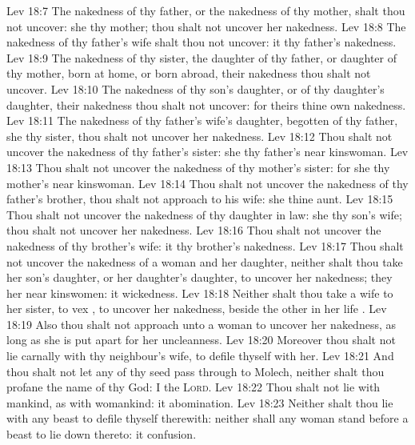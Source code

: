 \vs Lev 18:7 The nakedness of thy father, or the nakedness of thy mother, shalt thou not uncover: she  thy mother; thou shalt not uncover her nakedness.
\vs Lev 18:8 The nakedness of thy father's wife shalt thou not uncover: it  thy father's nakedness.
\vs Lev 18:9 The nakedness of thy sister, the daughter of thy father, or daughter of thy mother,  born at home, or born abroad,  their nakedness thou shalt not uncover.
\vs Lev 18:10 The nakedness of thy son's daughter, or of thy daughter's daughter,  their nakedness thou shalt not uncover: for theirs  thine own nakedness.
\vs Lev 18:11 The nakedness of thy father's wife's daughter, begotten of thy father, she  thy sister, thou shalt not uncover her nakedness.
\vs Lev 18:12 Thou shalt not uncover the nakedness of thy father's sister: she  thy father's near kinswoman.
\vs Lev 18:13 Thou shalt not uncover the nakedness of thy mother's sister: for she  thy mother's near kinswoman.
\vs Lev 18:14 Thou shalt not uncover the nakedness of thy father's brother, thou shalt not approach to his wife: she  thine aunt.
\vs Lev 18:15 Thou shalt not uncover the nakedness of thy daughter in law: she  thy son's wife; thou shalt not uncover her nakedness.
\vs Lev 18:16 Thou shalt not uncover the nakedness of thy brother's wife: it  thy brother's nakedness.
\vs Lev 18:17 Thou shalt not uncover the nakedness of a woman and her daughter, neither shalt thou take her son's daughter, or her daughter's daughter, to uncover her nakedness;  they  her near kinswomen: it  wickedness.
\vs Lev 18:18 Neither shalt thou take a wife to her sister, to vex , to uncover her nakedness, beside the other in her life .
\vs Lev 18:19 Also thou shalt not approach unto a woman to uncover her nakedness, as long as she is put apart for her uncleanness.
\vs Lev 18:20 Moreover thou shalt not lie carnally with thy neighbour's wife, to defile thyself with her.
\vs Lev 18:21 And thou shalt not let any of thy seed pass through  to Molech, neither shalt thou profane the name of thy God: I  the \textsc{Lord}.
\vs Lev 18:22 Thou shalt not lie with mankind, as with womankind: it  abomination.
\vs Lev 18:23 Neither shalt thou lie with any beast to defile thyself therewith: neither shall any woman stand before a beast to lie down thereto: it  confusion.

